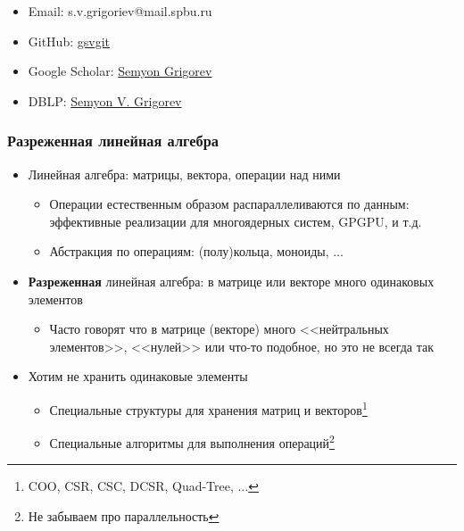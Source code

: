 \documentclass[xcolor=table,aspectratio=169]{beamer}
\begin{document}
\begin{frame}[fragile]
\begin{minipage}[t]{0.29\textwidth}
\begin{center}
  \end{center}
  {\scriptsize
\begin{itemize}    
  \item Email: s.v.grigoriev@mail.spbu.ru
  \item GitHub: \href{https://github.com/gsvgit}{gsvgit}
  \item Google Scholar: \href{https://scholar.google.com/citations?hl=ru&user=kP4dqUAAAAAJ&view_op=list_works&sortby=pubdate}{Semyon Grigorev}
  \item DBLP: \href{https://dblp.org/pid/181/9903.html}{Semyon V. Grigorev}
\end{itemize}
  }
\end{minipage}
\end{frame}

\begin{frame}[fragile]
  \frametitle{Разреженная линейная алгебра}
  \begin{itemize}
    \item Линейная алгебра: матрицы, вектора, операции над ними
    \begin{itemize}
      \item Операции естественным образом распараллеливаются по данным: эффективные реализации для многоядерных систем, GPGPU, и т.д.
      \item Абстракция по операциям: (полу)кольца, моноиды, $\ldots$
    \end{itemize}
    \item \textbf{Разреженная} линейная алгебра: в матрице или векторе много одинаковых элементов
    \begin{itemize}
      \item Часто говорят что в матрице (векторе) много <<нейтральных элементов>>, <<нулей>> или что-то подобное, но это не всегда так
    \end{itemize}
    \item Хотим не хранить одинаковые элементы
    \begin{itemize}
      \item Специальные структуры для хранения матриц и векторов\footnote{COO, CSR, CSC, DCSR, Quad-Tree, $\ldots$}
      \item Специальные алгоритмы для выполнения операций\footnote{Не забываем про параллельность}
    \end{itemize}
  \end{itemize}
\end{frame}
\end{document}
